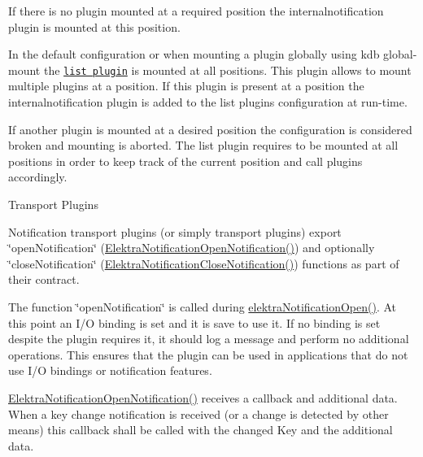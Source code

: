 \begin{DoxyItemize}
\item If there is no plugin mounted at a required position the internalnotification plugin is mounted at this position.
\item In the default configuration or when mounting a plugin globally using {\ttfamily kdb global-\/mount} the \href{https://www.libelektra.org/plugins/list}{\tt list plugin} is mounted at all positions. This plugin allows to mount multiple plugins at a position. If this plugin is present at a position the internalnotification plugin is added to the list plugin\textquotesingle{}s configuration at run-\/time.
\item If another plugin is mounted at a desired position the configuration is considered broken and mounting is aborted. The list plugin requires to be mounted at all positions in order to keep track of the current position and call plugins accordingly.
\end{DoxyItemize}

\begin{DoxyParagraph}{Transport Plugins}

\end{DoxyParagraph}
Notification transport plugins (or simply transport plugins) export \char`\"{}open\+Notification\char`\"{} (\hyperlink{kdbnotificationinternal_8h_adf7cf73a2740a3852b73d607b911a254}{Elektra\+Notification\+Open\+Notification()}) and optionally \char`\"{}close\+Notification\char`\"{} (\hyperlink{kdbnotificationinternal_8h_adc260d2c576df585aaa965cf97bc9284}{Elektra\+Notification\+Close\+Notification()}) functions as part of their contract.

The function \char`\"{}open\+Notification\char`\"{} is called during \hyperlink{kdbnotification_8h_aeae96154abdb5fdbf1b34a01e2b23e44}{elektra\+Notification\+Open()}. At this point an I/O binding is set and it is save to use it. If no binding is set despite the plugin requires it, it should log a message and perform no additional operations. This ensures that the plugin can be used in applications that do not use I/O bindings or notification features.

\hyperlink{kdbnotificationinternal_8h_adf7cf73a2740a3852b73d607b911a254}{Elektra\+Notification\+Open\+Notification()} receives a callback and additional data. When a key change notification is received (or a change is detected by other means) this callback shall be called with the changed Key and the additional data. 